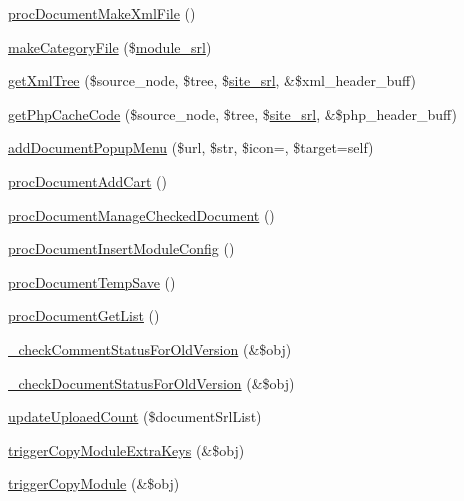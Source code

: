 \begin{DoxyCompactItemize}
\item 
\hyperlink{classdocumentController_a749d60be23e4645a5656a82a4fae1962}{proc\+Document\+Make\+Xml\+File} ()
\item 
\hyperlink{classdocumentController_a75dc24adc286b03e6eeb23eb7f771d8f}{make\+Category\+File} (\$\hyperlink{ko_8install_8php_a370bb6450fab1da3e0ed9f484a38b761}{module\+\_\+srl})
\item 
\hyperlink{classdocumentController_ad18d5e7c2cfbef82020548e13e00df7d}{get\+Xml\+Tree} (\$source\+\_\+node, \$tree, \$\hyperlink{ko_8install_8php_a8b1406b4ad1048041558dce6bfe89004}{site\+\_\+srl}, \&\$xml\+\_\+header\+\_\+buff)
\item 
\hyperlink{classdocumentController_a0e0c1eb0506e936703b6b2b4ed958e5f}{get\+Php\+Cache\+Code} (\$source\+\_\+node, \$tree, \$\hyperlink{ko_8install_8php_a8b1406b4ad1048041558dce6bfe89004}{site\+\_\+srl}, \&\$php\+\_\+header\+\_\+buff)
\item 
\hyperlink{classdocumentController_a998494e65442195eae417bb1b8e3fb82}{add\+Document\+Popup\+Menu} (\$url, \$str, \$icon=\textquotesingle{}\textquotesingle{}, \$target=\textquotesingle{}self\textquotesingle{})
\item 
\hyperlink{classdocumentController_a9072167f6533f269be32a0a43e147dae}{proc\+Document\+Add\+Cart} ()
\item 
\hyperlink{classdocumentController_a96dee41cd75a387fee93375d33633aba}{proc\+Document\+Manage\+Checked\+Document} ()
\item 
\hyperlink{classdocumentController_aede408d35ea6622dfa1b39ec52f84e44}{proc\+Document\+Insert\+Module\+Config} ()
\item 
\hyperlink{classdocumentController_a65e4d6ef48c59e92bf82e8ced4b85d4d}{proc\+Document\+Temp\+Save} ()
\item 
\hyperlink{classdocumentController_a23cf92fe7c204813d12c5996360cd939}{proc\+Document\+Get\+List} ()
\item 
\hyperlink{classdocumentController_a3fad5f9653c0ca05bcb1a63a24c318cf}{\+\_\+check\+Comment\+Status\+For\+Old\+Version} (\&\$obj)
\item 
\hyperlink{classdocumentController_ad0d7bdcafe22b9f7ee8f5ae072f3f146}{\+\_\+check\+Document\+Status\+For\+Old\+Version} (\&\$obj)
\item 
\hyperlink{classdocumentController_a2e3e591a2262e0fffc195456248b89ff}{update\+Uploaed\+Count} (\$document\+Srl\+List)
\item 
\hyperlink{classdocumentController_a5e03be29c7b61f87658b604ba80daa88}{trigger\+Copy\+Module\+Extra\+Keys} (\&\$obj)
\item 
\hyperlink{classdocumentController_a612ee2c47ff03e76f6e86fa31ff098a7}{trigger\+Copy\+Module} (\&\$obj)
\end{DoxyCompactItemize}
